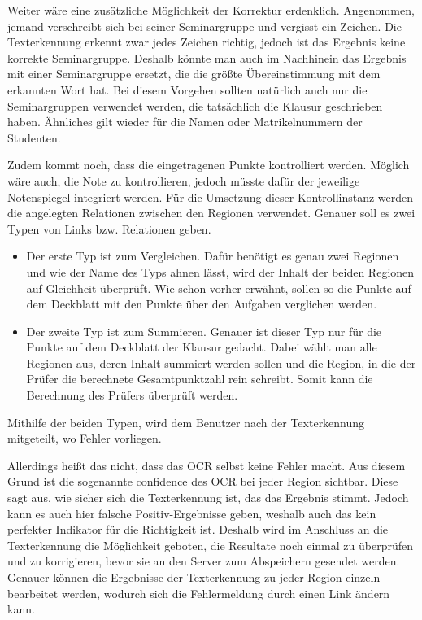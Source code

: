 \documentclass[nomenclature, oneside, 150]{HSMW-Thesis}
\begin{document}
	Weiter wäre eine zusätzliche Möglichkeit der Korrektur erdenklich. Angenommen, jemand verschreibt sich bei seiner Seminargruppe und vergisst ein Zeichen. Die Texterkennung erkennt zwar jedes Zeichen richtig, jedoch ist das Ergebnis keine korrekte Seminargruppe. Deshalb könnte man auch im Nachhinein das Ergebnis mit einer Seminargruppe ersetzt, die die größte Übereinstimmung mit dem erkannten Wort hat. Bei diesem Vorgehen sollten natürlich auch nur die Seminargruppen verwendet werden, die tatsächlich die Klausur geschrieben haben. Ähnliches gilt wieder für die Namen oder Matrikelnummern der Studenten.
	
	Zudem kommt noch, dass die eingetragenen Punkte kontrolliert werden. Möglich wäre auch, die Note zu kontrollieren, jedoch müsste dafür der jeweilige Notenspiegel integriert werden. Für die Umsetzung dieser Kontrollinstanz werden die angelegten Relationen zwischen den Regionen verwendet. Genauer soll es zwei Typen von Links bzw. Relationen geben.
		\begin{itemize}
			\item Der erste Typ ist zum Vergleichen. Dafür benötigt es genau zwei Regionen und wie der Name des Typs ahnen lässt, wird der Inhalt der beiden Regionen auf Gleichheit überprüft. Wie schon vorher erwähnt, sollen so die Punkte auf dem Deckblatt mit den Punkte über den Aufgaben verglichen werden.
			\item Der zweite Typ ist zum Summieren. Genauer ist dieser Typ nur für die Punkte auf dem Deckblatt der Klausur gedacht. Dabei wählt man alle Regionen aus, deren Inhalt summiert werden sollen und die Region, in die der Prüfer die berechnete Gesamtpunktzahl rein schreibt. Somit kann die Berechnung des Prüfers überprüft werden.
		\end{itemize} 
		Mithilfe der beiden Typen, wird dem Benutzer nach der Texterkennung mitgeteilt, wo Fehler vorliegen.
		
	Allerdings heißt das nicht, dass das OCR selbst keine Fehler macht. Aus diesem Grund ist die sogenannte confidence des OCR bei jeder Region sichtbar. Diese sagt aus, wie sicher sich die Texterkennung ist, das das Ergebnis stimmt. Jedoch kann es auch hier falsche Positiv-Ergebnisse geben, weshalb auch das kein perfekter Indikator für die Richtigkeit ist. Deshalb wird im Anschluss an die Texterkennung die Möglichkeit geboten, die Resultate noch einmal zu überprüfen und zu korrigieren, bevor sie an den Server zum Abspeichern gesendet werden. Genauer können die Ergebnisse der Texterkennung zu jeder Region einzeln bearbeitet werden, wodurch sich die Fehlermeldung durch einen Link ändern kann.
\end{document}
